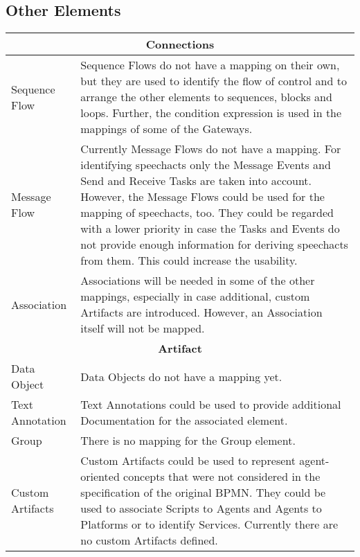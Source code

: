 \subsection{Other Elements}

\begin{longtable}{|p{3.5cm}|p{10.5cm}|}
\hline
\multicolumn{2}{|c|}{\textbf{Connections}}
\\\hline
Sequence Flow           & Sequence Flows do not have a mapping on their own, but they are used to identify the flow of control and to arrange the other elements to sequences, blocks and loops. Further, the condition expression is used in the mappings of some of the Gateways.
\\\hline
Message Flow            & Currently Message Flows do not have a mapping. For identifying speechacts only the Message Events and Send and Receive Tasks are taken into account. However, the Message Flows could be used for the mapping of speechacts, too. They could be regarded with a lower priority in case the Tasks and Events do not provide enough information for deriving speechacts from them. This could increase the usability.
\\\hline
Association             & Associations will be needed in some of the other mappings, especially in case additional, custom Artifacts are introduced. However, an Association itself will not be mapped.
\\\hline

\hline
\multicolumn{2}{|c|}{\textbf{Artifact}}
\\\hline
Data Object             & Data Objects do not have a mapping yet.
\\\hline
Text Annotation         & Text Annotations could be used to provide additional Documentation for the associated element.
\\\hline
Group                   & There is no mapping for the Group element.
\\\hline
Custom Artifacts        & Custom Artifacts could be used to represent agent-oriented concepts that were not considered in the specification of the original BPMN. They could be used to associate Scripts to Agents and Agents to Platforms or to identify Services. Currently there are no custom Artifacts defined.
\\\hline


\end{longtable}
